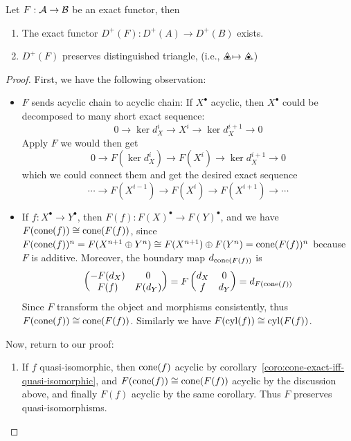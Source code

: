 \begin{prop}
  Let $F: \mathcal{A} \to \mathcal{B}$ be an exact functor, then
  \begin{enumerate}
    \item The exact functor $D^+(F): D^+(A) \to D^+(B)$ exists.
    \item $D^+(F)$ preserves distinguished triangle, (i.e., $\tridot \mapsto \tridot$.)
  \end{enumerate}
  \begin{proof} \hfill
    First, we have the following observation:
    \begin{itemize}
      \item $F$ sends acyclic chain to acyclic chain:
        If $X^\bullet$ acyclic, then $X^\bullet$ could be decomposed to
        many short exact sequence:
        \[ 0 \to \ker d_X^i \to X^i \to \ker d_X^{i+1} \to 0 \]
        Apply $F$ we would then get
        \[ 0 \to F(\ker d_X^i) \to F(X^i) \to \ker d_X^{i+1} \to 0 \]
        which we could connect them and get the desired exact sequence
        \[ \cdots \to F(X^{i-1}) \to F(X^i) \to F(X^{i+1}) \to \cdots \]
      \item If $f : X^\bullet \to Y^\bullet$, then $F(f): F(X)^\bullet \to F(Y)^\bullet$,
        and we have $F(\operatorname{cone}(f)) \cong \operatorname{cone}(F(f))$,
        since $F(\operatorname{cone}(f))^n = F(X^{n+1} \oplus Y^n) \cong F(X^{n+1}) \oplus F(Y^n)
        = \operatorname{cone}(F(f))^n$ because $F$ is additive.
        Moreover, the boundary map $d_{\operatorname{cone}(F(f))}$ is
        \[ \begin{pmatrix}
            -F(d_X) & 0 \\ F(f) & F(d_Y)
        \end{pmatrix} = F \begin{pmatrix}
            d_X & 0 \\ f & d_Y
          \end{pmatrix} = d_{F(\operatorname{cone}(f))}
        \]
        Since $F$ transform the object and morphisms consistently, thus
        $F(\operatorname{cone}(f)) \cong \operatorname{cone}(F(f))$. Similarly we have
        $F(\operatorname{cyl}(f)) \cong \operatorname{cyl}(F(f))$.
    \end{itemize}
    Now, return to our proof:
    \begin{enumerate}
      \item If $f$ quasi-isomorphic, then $\operatorname{cone}(f)$ acyclic by
        corollary~\ref{coro:cone-exact-iff-quasi-isomorphic},
        and $F(\operatorname{cone}(f)) \cong \operatorname{cone}(F(f))$ acyclic by the discussion
        above, and finally $F(f)$ acyclic by the same corollary.
        Thus $F$ preserves quasi-isomorphisms.


\end{enumerate}
\end{proof}
\end{prop}
